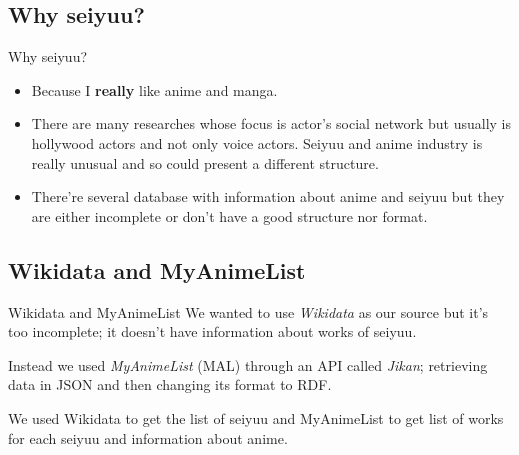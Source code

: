\subsection{Why seiyuu?}
\begin{frame}{Why seiyuu?}
\begin{itemize}
\item Because I \textbf{really} like anime and manga.

\item There are many researches whose focus is actor's social network but usually is hollywood actors and not only voice actors. Seiyuu and anime industry is really unusual and so could present a different structure.

\item There're several database with information about anime and seiyuu but they are either incomplete or don't have a good structure nor format.
\end{itemize}
\end{frame}

\subsection{Wikidata and MyAnimeList}
\begin{frame}{Wikidata and MyAnimeList}
We wanted to use \emph{Wikidata} as our source but it's too incomplete; it doesn't have information about works of seiyuu.
\vspace{15pt}

Instead we used \emph{MyAnimeList} (MAL) through an API called \emph{Jikan}; retrieving data in JSON and then changing its format to RDF.
\vspace{15pt}

We used Wikidata to get the list of seiyuu and MyAnimeList to get list of works for each seiyuu and information about anime.
\end{frame}

